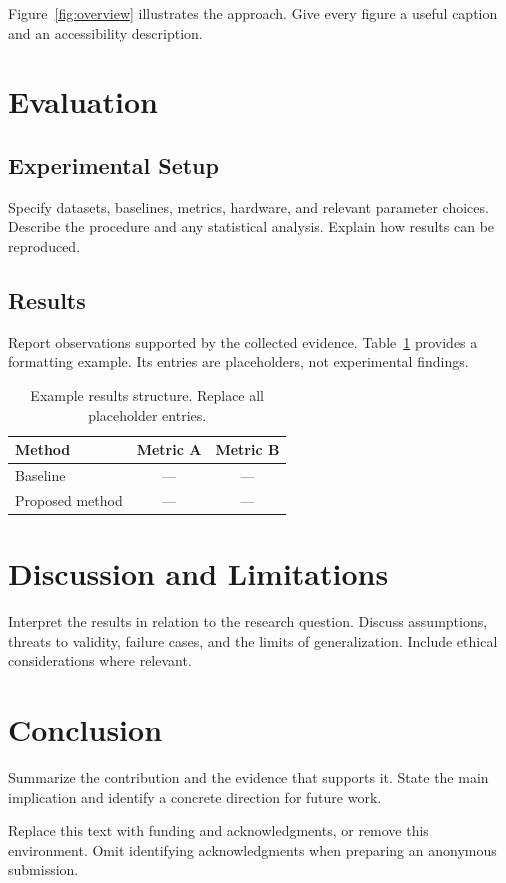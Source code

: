 \documentclass[sigconf]{acmart}
\begin{document}
Figure~\ref{fig:overview} illustrates the approach. Give every figure a useful
caption and an accessibility description.

\section{Evaluation}
\subsection{Experimental Setup}
Specify datasets, baselines, metrics, hardware, and relevant parameter choices.
Describe the procedure and any statistical analysis. Explain how results can
be reproduced.

\subsection{Results}
Report observations supported by the collected evidence.
Table~\ref{tab:results} provides a formatting example. Its entries are
placeholders, not experimental findings.

\begin{table}[t]
  \caption{Example results structure. Replace all placeholder entries.}
  \label{tab:results}
  \centering
  \begin{tabular}{lcc}
    \toprule
    Method & Metric A & Metric B \\
    \midrule
    Baseline & --- & --- \\
    Proposed method & --- & --- \\
    \bottomrule
  \end{tabular}
\end{table}

\section{Discussion and Limitations}
Interpret the results in relation to the research question. Discuss
assumptions, threats to validity, failure cases, and the limits of
generalization. Include ethical considerations where relevant.

\section{Conclusion}
Summarize the contribution and the evidence that supports it. State the main
implication and identify a concrete direction for future work.

\begin{acks}
Replace this text with funding and acknowledgments, or remove this environment.
Omit identifying acknowledgments when preparing an anonymous submission.
\end{acks}



\end{document}
